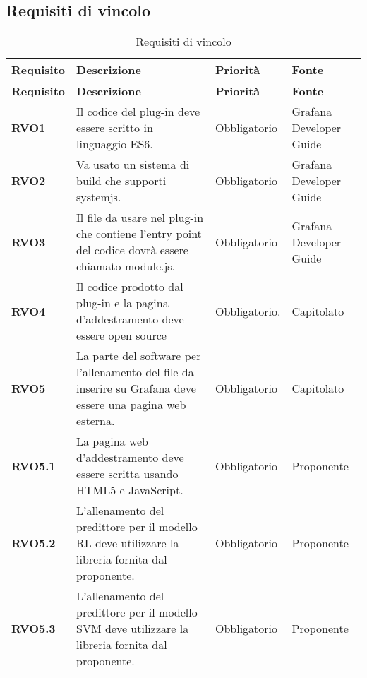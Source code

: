 \subsection{Requisiti di vincolo}
\label{sub:requisiti_di_vincolo}

\renewcommand{\arraystretch}{2} %
\begin{longtable}[H]{>{\centering\bfseries}m{2cm} >{\centering}m{9cm} >{\centering}m{2.5cm} >{\centering\arraybackslash}m{2.5cm}}
  \caption{Requisiti di vincolo}%
  \label{tab:requisiti_di_vincolo}                                                    \\
  \rowcolor{lightgray}
  {\textbf{Requisito}} & {\textbf{Descrizione}} & {\textbf{Priorità}} & {\textbf{Fonte}}  \\
  \endfirsthead%
  \rowcolor{lightgray}
  {\textbf{Requisito}} & {\textbf{Descrizione}} & {\textbf{Priorità}} & {\textbf{Fonte}}  \\
  \endhead%
  \rowcolor{white}
  \multicolumn{4}{c}{\textit{Continua alla pagina successiva}}
  \endfoot%
  \endlastfoot%
  \textbf{RVO1} & Il codice del plug-in deve essere scritto in linguaggio ES6. & Obbligatorio & Grafana Developer Guide \\
  \textbf{RVO2} & Va usato un sistema di build che supporti systemjs. & Obbligatorio & Grafana Developer Guide \\
  \textbf{RVO3} & Il file da usare nel plug-in che contiene l'entry point del codice dovrà essere chiamato module.js. & Obbligatorio & Grafana Developer Guide \\
  \textbf{RVO4} & Il codice prodotto dal plug-in e la pagina d'addestramento deve essere open source & Obbligatorio. & Capitolato \\
  \textbf{RVO5} & La parte del software per l'allenamento del file da inserire su Grafana deve essere una pagina web esterna. & Obbligatorio & Capitolato \\
  \textbf{RVO5.1} & La pagina web d'addestramento deve essere scritta usando HTML5 e JavaScript. & Obbligatorio & Proponente \\
  \textbf{RVO5.2} &	L'allenamento del predittore per il modello RL deve utilizzare la libreria fornita dal proponente. & Obbligatorio & Proponente \\
  \textbf{RVO5.3} &	L'allenamento del predittore per il modello SVM deve utilizzare la libreria fornita dal proponente. & Obbligatorio & Proponente \\

\end{longtable}
